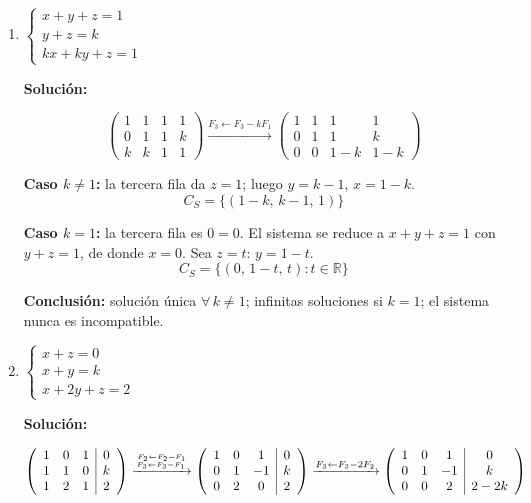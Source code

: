 \documentclass[12pt]{article}
\newcommand{\solucion}{%
    \vspace{0.8em}%
    \textbf{Solución:}%
}
\begin{document}
\begin{enumerate}[label=\alph*.-]
    \item $\begin{cases} x + y + z = 1 \\ y + z = k \\ kx + ky + z = 1 \end{cases}$

    \solucion
    \[
    \left(\begin{array}{ccc|c}
    1 & 1 & 1 & 1 \\ 0 & 1 & 1 & k \\ k & k & 1 & 1
    \end{array}\right)
    \xrightarrow{F_3 \leftarrow F_3 - kF_1}
    \left(\begin{array}{ccc|c}
    1 & 1 & 1 & 1 \\ 0 & 1 & 1 & k \\ 0 & 0 & 1-k & 1-k
    \end{array}\right)
    \]

    \textbf{Caso $k \neq 1$:} la tercera fila da $z = 1$; luego $y = k-1$, $x = 1-k$.
    \[\boxed{C_S = \{(1-k,\,k-1,\,1)\}}\]

    \textbf{Caso $k = 1$:} la tercera fila es $0=0$. El sistema se reduce a
    $x+y+z=1$ con $y+z=1$, de donde $x=0$. Sea $z=t$: $y=1-t$.
    \[\boxed{C_S = \{(0,\,1-t,\,t):t\in\mathbb{R}\}}\]

    \textbf{Conclusión:} solución única $\forall\,k\neq1$; infinitas soluciones si $k=1$; el sistema nunca es incompatible.

    \newpage
    \item $\begin{cases} x + z = 0 \\ x + y = k \\ x + 2y + z = 2 \end{cases}$

    \solucion
    \[
    \left(\begin{array}{ccc|c}
    1 & 0 & 1 & 0 \\ 1 & 1 & 0 & k \\ 1 & 2 & 1 & 2
    \end{array}\right)
    \xrightarrow{F_2 \leftarrow F_2 - F_1 \atop F_3 \leftarrow F_3 - F_1}
    \left(\begin{array}{ccc|c}
    1 & 0 & 1 & 0 \\ 0 & 1 & -1 & k \\ 0 & 2 & 0 & 2
    \end{array}\right)
    \xrightarrow{F_3 \leftarrow F_3 - 2F_2}
    \left(\begin{array}{ccc|c}
    1 & 0 & 1 & 0 \\ 0 & 1 & -1 & k \\ 0 & 0 & 2 & 2-2k
    \end{array}\right)
    \]


\end{enumerate}
\end{document}
